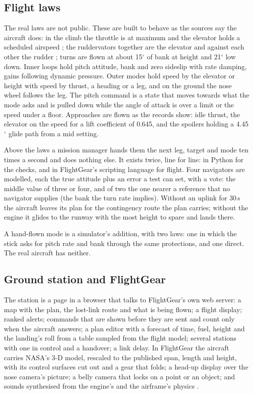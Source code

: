 \documentclass[10pt,a4paper,twocolumn]{article}
\begin{document}
\subsection{Flight laws}\label{sec:lawsdesc}
The real laws are not public. These are built to behave as the sources say the aircraft does: in the climb the throttle is at maximum and the elevator
holds a scheduled airspeed \cite{pastor}; the ruddervators together are the elevator and against each other the rudder \cite{sfte}; turns are flown
at about 15$^\circ$ of bank at height and 21$^\circ$ low down. Inner loops hold pitch attitude, bank and zero sideslip with rate damping, gains following
dynamic pressure. Outer modes hold speed by the elevator or height with speed by thrust, a heading or a leg, and on the ground the nose wheel
follows the leg. The pitch command is a state that moves towards what the mode asks and is pulled down while the angle of attack is over a limit or the
speed under a floor. Approaches are flown as the records show: idle thrust, the elevator on the speed for a lift coefficient of 0.645, and the spoilers
holding a 4.45$^\circ$ glide path from a mid setting.

Above the laws a mission manager hands them the next leg, target and mode ten times a second and does nothing else. It exists twice, line for line: in
Python for the checks, and in FlightGear's scripting language for flight. Four navigators are modelled, each the true attitude plus an error a test
can set, with a vote: the middle value of three or four, and of two the one nearer a reference that no navigator supplies (the bank the turn rate
implies). Without an uplink for 30\,s the aircraft leaves its plan for the contingency route the plan carries; without the engine it glides to the
runway with the most height to spare and lands there.

A hand-flown mode is a simulator's addition, with two laws: one in which the stick asks for pitch rate and bank through the same protections, and one
direct. The real aircraft has neither.

\subsection{Ground station and FlightGear}\label{sec:fg}
The station is a page in a browser that talks to FlightGear's own web server: a map with the plan, the lost-link route and what is being flown; a flight
display; ranked alerts; commands that are shown before they are sent and count only when the aircraft answers; a plan editor with a forecast of time,
fuel, height and the landing's roll from a table sampled from the flight model; several stations with one in control and a handover; a link delay. In
FlightGear the aircraft carries NASA's 3-D model, rescaled to the published span, length and height, with its control surfaces cut out and a gear
that folds; a head-up display over the nose camera's picture; a belly camera that locks on a point or an object; and sounds synthesised from the engine's
and the airframe's physics \cite{pww}.
\end{document}
